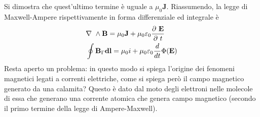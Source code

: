 \documentclass[
10pt, %
a4paper, %
oneside, %
headinclude,footinclude, %
BCOR5mm, %
]{scrartcl}
\begin{document}
Si dimostra che quest'ultimo termine è uguale a \(\mu_0\mathbf{J}\).
Riassumendo, la legge di Maxwell-Ampere rispettivamente in forma differenziale ed integrale è
\begin{align}\label{eq:legge_Maxwell_Ampere}
	&\mathbf{\nabla\ }\wedge\mathbf{B}=\mu_0\mathbf{J}+\mu_0\varepsilon_0\frac{\partial\ \mathbf{E}}{\partial\  t}\\
	&\oint\mathbf{B}_{\Gamma}\mathbf{dl}= \mu_0 i + \mu_0\varepsilon_0\frac{d}{dt}\Phi(\mathbf{E})
\end{align}
Resta aperto un problema: in questo modo si spiega l'origine dei fenomeni magnetici legati a correnti elettriche, come si spiega però il campo magnetico generato da una calamita? Questo è dato dal moto degli elettroni nelle molecole di essa che generano una corrente atomica che genera campo magnetico (secondo il primo termine della legge di Ampere-Maxwell).
\end{document}
